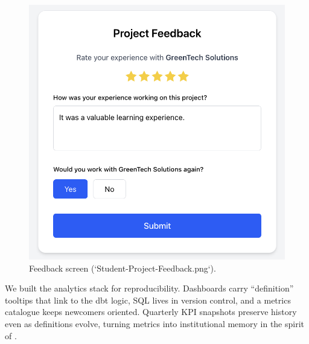 \begin{figure}[h]
  \centering
  \includegraphics[width=0.8\linewidth]{figures/Student-Project-Feedback.png}
  \caption{Feedback screen (`Student-Project-Feedback.png`).}
  \label{fig:feedback-screen}
\end{figure}

We built the analytics stack for reproducibility. Dashboards carry ``definition'' tooltips that link to the dbt logic, SQL lives in version control, and a metrics catalogue keeps newcomers oriented. Quarterly KPI snapshots preserve history even as definitions evolve, turning metrics into institutional memory in the spirit of \citet{Choudary2016}.
